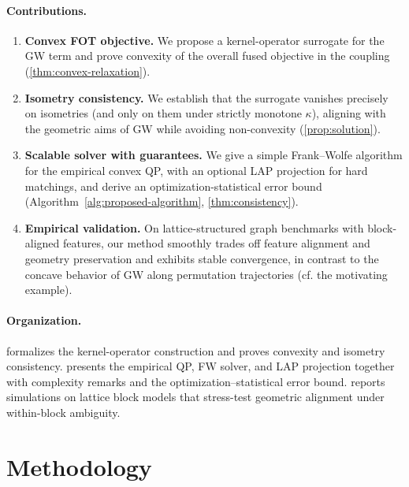 \documentclass{article}
\begin{document}
\paragraph{Contributions.}
\begin{enumerate}
	\item \textbf{Convex FOT objective.} We propose a kernel-operator surrogate for the GW term and prove convexity of the overall fused objective in the coupling (\cref{thm:convex-relaxation}).
	\item \textbf{Isometry consistency.} We establish that the surrogate vanishes precisely on isometries (and only on them under strictly monotone $\kappa$), aligning with the geometric aims of GW while avoiding non-convexity (\cref{prop:solution}).
	\item \textbf{Scalable solver with guarantees.} We give a simple Frank–Wolfe algorithm for the empirical convex QP, with an optional LAP projection for hard matchings, and derive an optimization-statistical error bound (Algorithm~\ref{alg:proposed-algorithm}, \cref{thm:consistency}).
	\item \textbf{Empirical validation.} On lattice-structured graph benchmarks with block-aligned features, our method smoothly trades off feature alignment and geometry preservation and exhibits stable convergence, in contrast to the concave behavior of GW along permutation trajectories (cf. the motivating example).
\end{enumerate}

\paragraph{Organization.}
 formalizes the kernel-operator construction and proves convexity and isometry consistency.  presents the empirical QP, FW solver, and LAP projection together with complexity remarks and the optimization–statistical error bound.  reports simulations on lattice block models that stress-test geometric alignment under within-block ambiguity.

\section{Methodology}\label{sec:Methodology}

\end{document}
